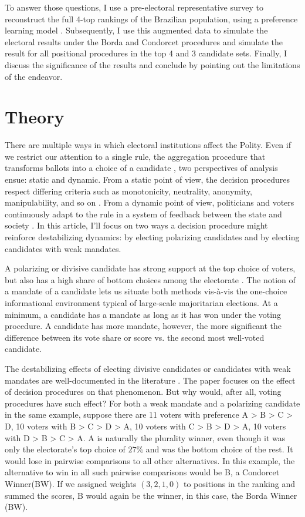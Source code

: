 \documentclass[hidelinks,11pt]{article}
\begin{document}
To answer those questions, I use a pre-electoral representative survey
to reconstruct the full 4-top rankings of the Brazilian population, using a
preference learning model \parencite{sorensen2019bayesmallows}. Subsequently, I
use this augmented data to simulate the electoral results under the Borda
and Condorcet procedures and simulate the result for all positional procedures
in the top 4 and 3 candidate sets. Finally, I discuss the significance of the
results and conclude by pointing out the limitations of the endeavor.


\section{Theory}
There are multiple ways in which electoral institutions affect the Polity. Even if we restrict our attention to a single rule, the aggregation procedure that transforms ballots into a choice of a candidate \parencite{Goodin_2006}, two perspectives of analysis ensue: static and dynamic. From a static point of view, the decision procedures respect differing criteria such as monotonicity, neutrality, anonymity, manipulability, and so on \parencite{nurmi1999voting}. From a dynamic point of view, politicians and voters continuously adapt to the rule in a system of feedback between the state and society \parencite{Wange2021systems}. In this article, I'll focus on two ways a decision procedure might reinforce destabilizing dynamics: by electing polarizing candidates and by electing candidates with weak mandates.


A polarizing or divisive candidate has strong support at the top
choice of voters, but also has a high share of bottom choices among the
electorate \parencite{igersheim22_compar_votin_method}.
The notion of a mandate of a candidate lets us situate both methods vis-{\`a}-vis
the one-choice informational environment typical of large-scale majoritarian
elections. At a minimum, a candidate has a mandate as long as it has won
under the voting procedure. A candidate has more mandate, however, the more significant
the difference between its vote share or score vs. the second most well-voted
candidate.

The destabilizing effects of electing divisive candidates or candidates with weak mandates are well-documented in the literature \parencite{kaminski2015empirical, luhrmann2018democracy, Baldassarrie2116863118, Bednare2113843118}. The paper focuses on the effect of decision procedures on that phenomenon. But why would, after all, voting procedures have such effect? For both a weak mandate and a polarizing candidate in the same example, suppose there are 11 voters with preference A > B > C > D, 10 voters with B > C > D > A, 10 voters with  C > B > D > A, 10 voters with D > B > C > A. A is naturally the plurality winner, even though it was only the electorate's top choice of \(27\%\) and was the bottom choice of the rest. It would lose in pairwise comparisons to all other alternatives. In this example, the alternative to win in all such pairwise comparisons would be B, a Condorcet Winner(BW). If we assigned weights \((3,2,1,0)\) to positions in the ranking and summed the scores, B would again be the winner, in this case, the Borda Winner (BW).
\end{document}
